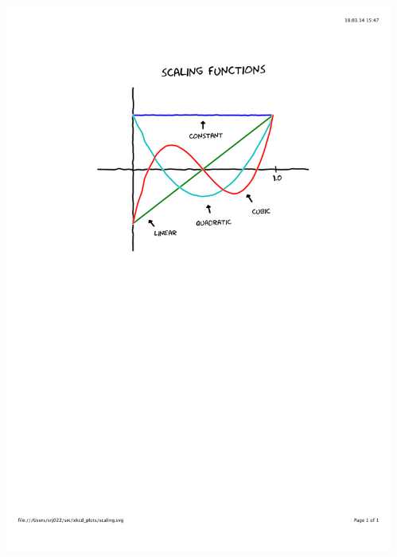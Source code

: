 \documentclass[mathserif, 8pt]{beamer}
\begin{document}
\begin{frame}
\begin{columns}
\begin{column}[b]{0.55\linewidth}
    \end{column}
    \begin{column}[b]{0.45\linewidth}
	\centering
	\includegraphics[scale=0.3, clip, viewport = 150 450 450 750]{figures/scaling.pdf}\\

\end{column}
\end{columns}
\end{frame}
\end{document}
